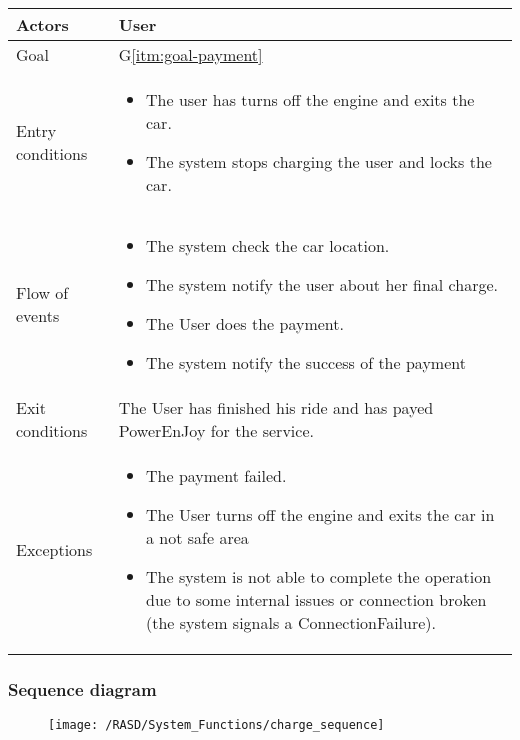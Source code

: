 \begin{center}
  \begin{tabular}{ l | p{10cm} }
    \hline
    Actors & User\\ \hline
    Goal & G\ref{itm:goal-payment}\\ \hline
    Entry conditions & 
    \begin{itemize}
    \item The user has turns off the engine and exits the car.
    \item The system stops charging the user and locks the car.
    \end{itemize} \\ \hline
    Flow of events &
\begin{itemize}
\item The system check the car location.
\item The system notify the user about her final charge.
\item The User does the payment.
\item The system notify the success of the payment
\end{itemize} \\ \hline
    Exit conditions & The User has finished his ride and has payed PowerEnJoy for the service. \\ \hline
  Exceptions & 
\begin{itemize}
\item The payment failed.
\item The User turns off the engine and exits the car in a not safe area
\item The system is not able to complete the operation due to some internal issues or connection broken (the system signals a ConnectionFailure).%
\end{itemize} \\ \hline
  \end{tabular}
\end{center}


\subsubsection{Sequence diagram}
\begin{figure}[!ht]
  \centering
  \vspace{0.1cm}
  \texttt{[image: /RASD/System\_Functions/charge\_sequence]}\\
  \vspace{0.1cm}
  \label{fig:charge_sequence} 
\end{figure}

